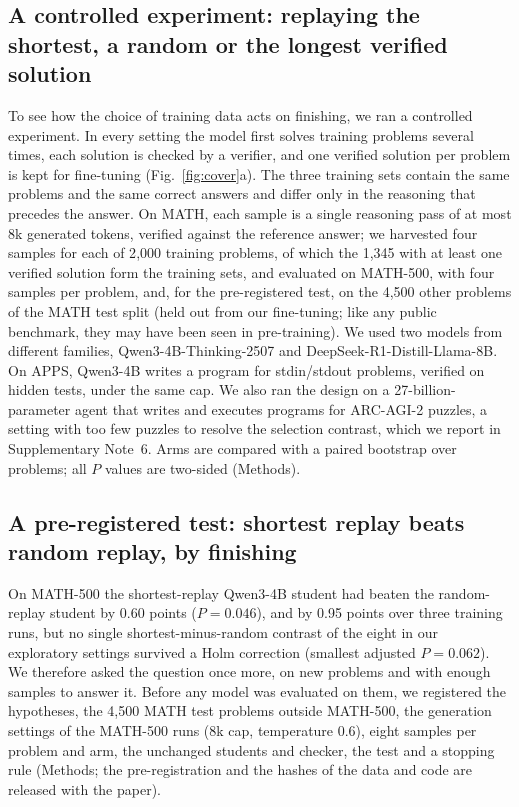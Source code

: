 \documentclass[10pt]{article}
\begin{document}
\subsection{A controlled experiment: replaying the shortest, a random or the longest verified solution}
To see how the choice of training data acts on finishing, we ran a controlled experiment. In every setting the model first solves training problems several times, each solution is checked by a verifier, and one verified solution per problem is kept for fine-tuning (Fig.~\ref{fig:cover}a). The three training sets contain the same problems and the same correct answers and differ only in the reasoning that precedes the answer. On MATH\cite{hendrycks2021math}, each sample is a single reasoning pass of at most 8k generated tokens, verified against the reference answer; we harvested four samples for each of 2{,}000 training problems, of which the 1{,}345 with at least one verified solution form the training sets, and evaluated on MATH-500\cite{lightman2023verify}, with four samples per problem, and, for the pre-registered test, on the 4{,}500 other problems of the MATH test split (held out from our fine-tuning; like any public benchmark, they may have been seen in pre-training). We used two models from different families, Qwen3-4B-Thinking-2507\cite{qwen3report} and DeepSeek-R1-Distill-Llama-8B\cite{guo2025deepseekr1,grattafiori2024llama3}. On APPS\cite{hendrycks2021apps}, Qwen3-4B writes a program for stdin/stdout problems, verified on hidden tests, under the same cap. We also ran the design on a 27-billion-parameter agent that writes and executes programs for ARC-AGI-2 puzzles\cite{chollet2025arcagi2}, a setting with too few puzzles to resolve the selection contrast, which we report in Supplementary Note~6. Arms are compared with a paired bootstrap over problems; all $P$ values are two-sided (Methods).

\subsection{A pre-registered test: shortest replay beats random replay, by finishing}
On MATH-500 the shortest-replay Qwen3-4B student had beaten the random-replay student by 0.60 points ($P=0.046$), and by 0.95 points over three training runs, but no single shortest-minus-random contrast of the eight in our exploratory settings survived a Holm correction (smallest adjusted $P=0.062$). We therefore asked the question once more, on new problems and with enough samples to answer it. Before any model was evaluated on them, we registered the hypotheses, the 4{,}500 MATH test problems outside MATH-500, the generation settings of the MATH-500 runs (8k cap, temperature 0.6), eight samples per problem and arm, the unchanged students and checker, the test and a stopping rule (Methods; the pre-registration and the hashes of the data and code are released with the paper).
\end{document}
